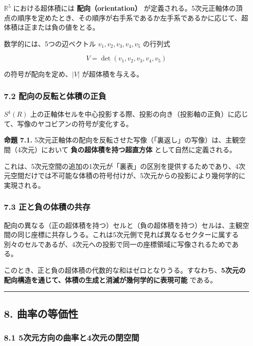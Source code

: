 \documentclass[a4paper,11pt]{ltjsarticle}
\begin{document}
\(\mathbb{R}^5\) における超体積には \textbf{配向（orientation）}
が定義される。5次元正軸体の頂点の順序を定めたとき、その順序が右手系であるか左手系であるかに応じて、超体積は正または負の値をとる。

数学的には、5つの辺ベクトル \(v_1, v_2, v_3, v_4, v_5\) の行列式

\[V = \det(v_1, v_2, v_3, v_4, v_5)\]

の符号が配向を定め、\(|V|\) が超体積を与える。

\subsubsection{7.2
配向の反転と体積の正負}\label{ux914dux5411ux306eux53cdux8ee2ux3068ux4f53ux7a4dux306eux6b63ux8ca0}

\(S^4(R)\)
上の正軸体セルを中心投影する際、投影の向き（投影軸の正負）に応じて、写像のヤコビアンの符号が変化する。

\textbf{命題 7.1.}
5次元正軸体の配向を反転させた写像（「裏返し」の写像）は、主観空間（4次元）において
\textbf{負の超体積を持つ超直方体} として自然に定義される。

これは、5次元空間の追加の1次元が「裏表」の区別を提供するためであり、4次元空間だけでは不可能な体積の符号付けが、5次元からの投影により幾何学的に実現される。

\subsubsection{7.3
正と負の体積の共存}\label{ux6b63ux3068ux8ca0ux306eux4f53ux7a4dux306eux5171ux5b58}

配向の異なる（正の超体積を持つ）セルと（負の超体積を持つ）セルは、主観空間の同じ座標に共存しうる。これは5次元側で見れば異なるセクターに属する別々のセルであるが、4次元への投影で同一の座標領域に写像されるためである。

このとき、正と負の超体積の代数的な和はゼロとなりうる。すなわち、\textbf{5次元の配向構造を通じて、体積の生成と消滅が幾何学的に表現可能}
である。

\begin{center}\rule{0.5\linewidth}{0.5pt}\end{center}

\subsection{8. 曲率の等価性}\label{ux66f2ux7387ux306eux7b49ux4fa1ux6027}

\subsubsection{8.1
5次元方向の曲率と4次元の閉空間}\label{ux6b21ux5143ux65b9ux5411ux306eux66f2ux7387ux30684ux6b21ux5143ux306eux9589ux7a7aux9593}
\end{document}
